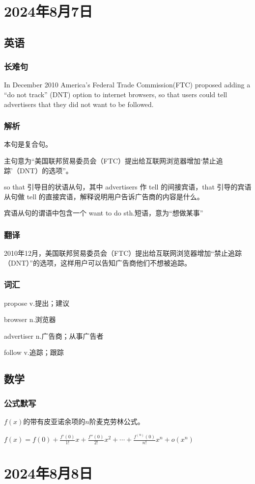 \documentclass[UTF8]{ctexart}
\begin{document}
\section{2024年8月7日}
\subsection{英语}
\subsubsection{长难句}
In December 2010 America's Federal Trade Commission(FTC) proposed adding a ``do not track'' (DNT) option to internet browsers, so that users could tell advertisers that they did not want to be followed.
\subsubsection{解析}
本句是复合句。

主句意为“美国联邦贸易委员会（FTC）提出给互联网浏览器增加‘禁止追踪’（DNT）的选项”。

so that 引导目的状语从句，其中 advertisers 作 tell 的间接宾语，that 引导的宾语从句做 tell 的直接宾语，解释说明用户告诉广告商的内容是什么。

宾语从句的谓语中包含一个 want to do sth.短语，意为“想做某事”
\subsubsection{翻译}
2010年12月，美国联邦贸易委员会（FTC）提出给互联网浏览器增加“禁止追踪（DNT）”的选项，这样用户可以告知广告商他们不想被追踪。
\subsubsection{词汇}
propose v.提出；建议

browser n.浏览器

advertiser n.广告商；从事广告者

follow v.追踪；跟踪
\subsection{数学}
\subsubsection{公式默写}
$f(x)$的带有皮亚诺余项的$n$阶麦克劳林公式。

$f(x)=f(0)+\frac{f'(0)}{1!}x+\frac{f''(0)}{2!}x^2+\cdots+\frac{f^{(n)}(0)}{n!}x^n+o(x^n)$
\section{2024年8月8日}
\end{document}

